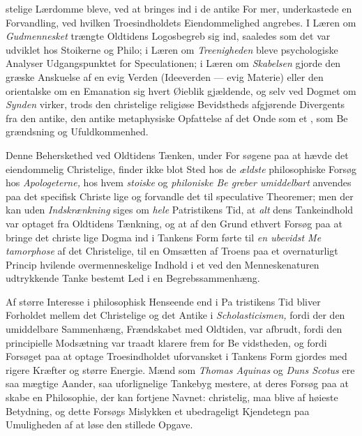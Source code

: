 stelige Lærdomme bleve, ved at bringes ind i de antike For\-%
mer, underkastede en Forvandling, ved hvilken Troesindholdets
Eiendommelighed angrebes. I Læren om \emph{Gudmennesket}
trængte Oldtidens Logosbegreb sig ind, saaledes som det var
udviklet hos Stoikerne og Philo; i Læren om \emph{Treenigheden}
bleve psychologiske Analyser Udgangspunktet for Speculationen;
i Læren om \emph{Skabelsen} gjorde den græske Anskuelse af en
evig Verden (Ideeverden --- evig Materie) eller den orientalske
om en Emanation sig hvert Øieblik gjældende, og selv ved
Dogmet om \emph{Synden} virker, trods den christelige religiøse
Bevidstheds afgjørende Divergents fra den antike, den antike
metaphysiske Opfattelse af det Onde som et , som Be\-%
grændsning og Ufuldkommenhed.

Denne Beherskethed ved Oldtidens Tænken, under For\-%
søgene paa at hævde det eiendommelig Christelige, finder
ikke blot Sted hos de \emph{ældste} philosophiske Forsøg hos
\emph{Apologeterne,} hos hvem \emph{stoiske} og \emph{philoniske Be\-%
greber umiddelbart} anvendes paa det specifisk Christe\-%
lige og forvandle det til speculative Theoremer; men der kan
uden \emph{Indskrænkning} siges om \emph{hele} Patristikens Tid, at
\emph{alt} dens Tankeindhold var optaget fra Oldtidens Tænkning,
og at af den Grund ethvert Forsøg paa at bringe det christe\-%
lige Dogma ind i Tankens Form førte til \emph{en ubevidst Me\-%
tamorphose} af det Christelige, til en Omsætten af Troens
paa et overnaturligt Princip hvilende overmenneskelige Indhold
i et ved den Menneskenaturen udtrykkende Tanke bestemt
Led i en Begrebssammenhæng.

Af større Interesse i philosophisk Henseende end i Pa\-%
tristikens Tid bliver Forholdet mellem det Christelige og det
Antike i \emph{Scholasticismen,} fordi der den umiddelbare
Sammenhæng, Frændskabet med Oldtiden, var afbrudt, fordi
den principielle Modsætning var traadt klarere frem for Be\-%
vidstheden, og fordi Forsøget paa at optage Troesindholdet
uforvansket i Tankens Form gjordes med rigere Kræfter og
større Energie. Mænd som \emph{Thomas Aquinas} og \emph{Duns
Scotus} ere saa mægtige Aander, saa uforlignelige Tankebyg\-%
mestere, at deres Forsøg paa at skabe en Philosophie, der
kan fortjene Navnet: christelig, maa blive af høieste Betydning,
og dette Forsøgs Mislykken et ubedrageligt Kjendetegn paa
Umuligheden af at løse den stillede Opgave.

